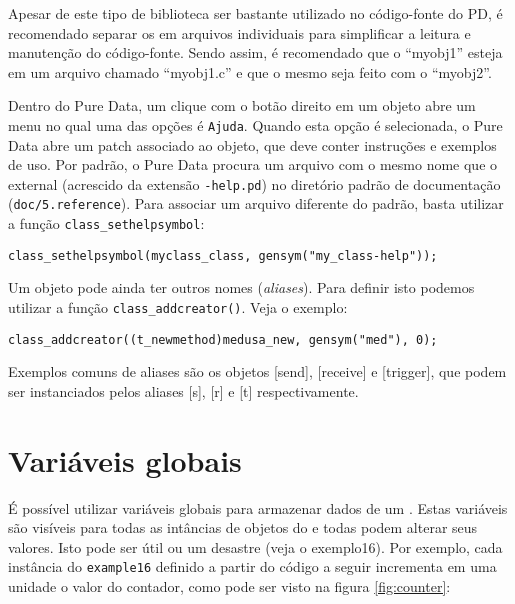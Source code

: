 Apesar de este tipo de biblioteca ser bastante utilizado no código-fonte do PD,
é recomendado separar os \external em arquivos individuais para simplificar
a leitura e manutenção do código-fonte.
Sendo assim, é recomendado que o \external ``myobj1'' esteja em um arquivo
chamado ``myobj1.c'' e que o mesmo seja feito com o \external ``myobj2''.

Dentro do Pure Data, um clique com o botão direito em um objeto abre um menu
no qual uma das opções é \texttt{Ajuda}. Quando esta opção é selecionada, o
Pure Data abre um patch associado ao objeto, que deve conter instruções e
exemplos de uso. Por padrão, o Pure Data procura um arquivo com o mesmo nome
que o external (acrescido da extensão \texttt{-help.pd}) no diretório padrão de
documentação (\texttt{doc/5.reference}). Para associar um arquivo diferente do
padrão, basta utilizar a função \texttt{class\_sethelpsymbol}:

\vspace{1em}
\begin{lstlisting}[caption=Definição de arquivo de help]
class_sethelpsymbol(myclass_class, gensym("my_class-help"));
\end{lstlisting}

Um objeto pode ainda ter outros nomes (\emph{aliases}). Para definir isto
podemos utilizar a função \texttt{class\_addcreator()}. Veja o exemplo:

\vspace{1em}
\begin{lstlisting}[caption=Definição de alias para um objeto]
class_addcreator((t_newmethod)medusa_new, gensym("med"), 0);
\end{lstlisting}

Exemplos comuns de aliases são os objetos [send], [receive] e [trigger], que
podem ser instanciados pelos aliases [s], [r] e [t] respectivamente.

\section{Variáveis globais}

É possível utilizar variáveis globais para armazenar dados de um \external.
Estas variáveis são visíveis para todas as intâncias de objetos do \external e
todas podem alterar seus valores.
Isto pode ser útil ou um desastre (veja o exemplo16).
Por exemplo, cada instância do \external \texttt{example16}
definido a partir do código a seguir incrementa em uma unidade o valor do
contador, como pode ser visto na figura \ref{fig:counter}:

